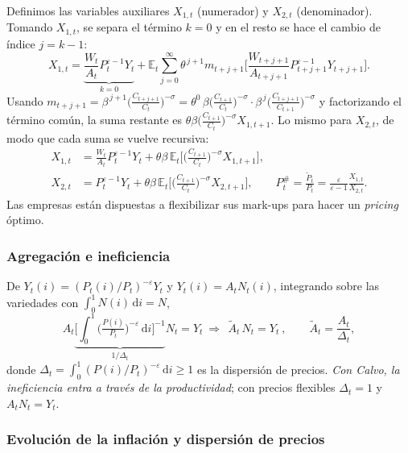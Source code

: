 \documentclass[11pt]{article}
\renewcommand{\boxed}[1]{#1}     %
\theoremstyle{definition}
\newcommand{\E}{\mathbb{E}}
\newcommand{\dd}{\,\mathrm{d}}
\begin{document}
Definimos las variables auxiliares $X_{1,t}$ (numerador) y $X_{2,t}$ (denominador). Tomando $X_{1,t}$,
se separa el término $k=0$ y en el resto se hace el cambio de índice $j=k-1$:
\begin{equation}
X_{1,t}=\underbrace{\frac{W_{t}}{A_{t}}P_{t}^{\varepsilon-1}Y_{t}}_{k=0}
+\E_{t}\sum_{j=0}^{\infty}\theta^{\,j+1}m_{t+j+1}\Big[\frac{W_{t+j+1}}{A_{t+j+1}}P_{t+j+1}^{\varepsilon-1}Y_{t+j+1}\Big].
\end{equation}
Usando $m_{t+j+1}=\beta^{\,j+1}\big(\tfrac{C_{t+j+1}}{C_{t}}\big)^{-\sigma}
=\theta^{0}\,\beta\big(\tfrac{C_{t+1}}{C_{t}}\big)^{-\sigma}\cdot\beta^{\,j}\big(\tfrac{C_{t+j+1}}{C_{t+1}}\big)^{-\sigma}$
y factorizando el término común, la suma restante es $\theta\beta\big(\tfrac{C_{t+1}}{C_{t}}\big)^{-\sigma}X_{1,t+1}$.
Lo mismo para $X_{2,t}$, de modo que cada suma se vuelve recursiva:
\begin{align}
X_{1,t}&=\frac{W_{t}}{A_{t}}P_{t}^{\varepsilon-1}Y_{t}
+\theta\beta\,\E_{t}\Big[\big(\tfrac{C_{t+1}}{C_{t}}\big)^{-\sigma}X_{1,t+1}\Big], \\
X_{2,t}&=P_{t}^{\varepsilon-1}Y_{t}
+\theta\beta\,\E_{t}\Big[\big(\tfrac{C_{t+1}}{C_{t}}\big)^{-\sigma}X_{2,t+1}\Big],
\qquad
P_{t}^{\#}=\frac{\widetilde{P}_{t}}{P_{t}}=\frac{\varepsilon}{\varepsilon-1}\frac{X_{1,t}}{X_{2,t}} .
\end{align}
Las empresas están dispuestas a flexibilizar sus mark-ups para hacer un \emph{pricing} óptimo.

\subsubsection{Agregación e ineficiencia}

De $Y_{t}(i)=(P_{t}(i)/P_{t})^{-\varepsilon}Y_{t}$ y $Y_{t}(i)=A_{t}N_{t}(i)$, integrando sobre las
variedades con $\int_{0}^{1}N(i)\dd i=N$,
\begin{equation}
A_{t}\underbrace{\Big[\int_{0}^{1}\big(\tfrac{P(i)}{P_{t}}\big)^{-\varepsilon}\dd i\Big]^{-1}}_{1/\Delta_{t}}N_{t}=Y_{t}
\ \Longrightarrow\
\boxed{\ \widetilde{A}_{t}\,N_{t}=Y_{t}\ },
\qquad
\widetilde{A}_{t}=\frac{A_{t}}{\Delta_{t}},
\end{equation}
donde $\Delta_{t}=\int_{0}^{1}(P(i)/P_{t})^{-\varepsilon}\dd i\ge1$ es la dispersión de precios.
\emph{Con Calvo, la ineficiencia entra a través de la productividad}; con precios flexibles
$\Delta_{t}=1$ y $A_{t}N_{t}=Y_{t}$.

\subsubsection{Evolución de la inflación y dispersión de precios}
\end{document}

